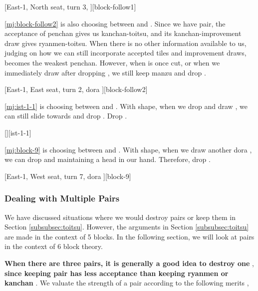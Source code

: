 \documentclass[12pt]{article}
\begin{document}
[East-1, North seat, turn 3, ][block-follow1]

\ref{mj:block-follow2} is also choosing between  and . Since we have  pair, the acceptance  of penchan  gives us  kanchan-toitsu, and its kanchan-improvement draw  gives  ryanmen-toitsu. When there is no other information available to us, judging on how we can still incorporate accepted tiles and improvement draws,  becomes the weakest penchan. However, when  is once cut, or when we immediately draw  after dropping , we still keep manzu and drop  \citep{yuusee-follow}.

[East-1, East seat, turn 2, dora ][block-follow2]

\ref{mj:ist-1-1} is choosing between  and . With  shape, when we drop  and draw , we can still slide towards  and drop . Drop  \citep{gendai-iishanten-yojouhai}.

[][ist-1-1]

\ref{mj:block-9} is choosing between  and . With  shape, when we draw another dora , we can drop  and maintaining a head in our hand. Therefore, drop  \citep[][p.~20]{uzaku-nankiru}.

[East-1, West seat, turn 7, dora ][block-9]


\subsubsection{Dealing with Multiple Pairs}

We have discussed situations where we would destroy pairs or keep them in Section \ref{subsubsec:toitsu}. However, the arguments in Section \ref{subsubsec:toitsu} are made in the context of 5 blocks. In the following section, we will look at pairs in the context of 6 block theory.

\textbf{When there are three pairs, it is generally a good idea to destroy one} \citep{gendai-toitsu}, \textbf{since keeping pair has less acceptance than keeping ryanmen or kanchan} \citep[p.~34][]{uzaku-haikouritsu}. We valuate the strength of a pair according to the following merits ,
\end{document}
